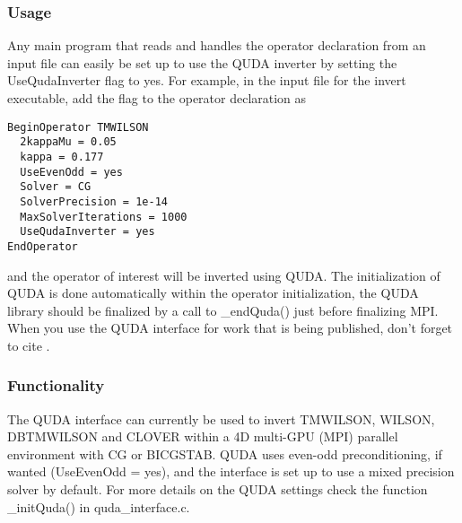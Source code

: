 \subsubsection{Usage}
Any main program that reads and handles the operator declaration from an input file can easily be set up to use the QUDA inverter by setting the {\ttfamily UseQudaInverter} flag to {\ttfamily yes}. For example, in the input file for the {\ttfamily invert} executable, add the flag to the operator declaration as
\begin{verbatim}
BeginOperator TMWILSON
  2kappaMu = 0.05
  kappa = 0.177
  UseEvenOdd = yes
  Solver = CG
  SolverPrecision = 1e-14
  MaxSolverIterations = 1000
  UseQudaInverter = yes
EndOperator
\end{verbatim}
and the operator of interest will be inverted using QUDA. The initialization of QUDA is done automatically within the operator initialization,  the QUDA library should be finalized by a call to {\ttfamily \_endQuda()} just before finalizing MPI. When you use the QUDA interface for work that is being published, don't forget to cite \cite{Clark:2009wm, Babich:2011np, Strelchenko:2013vaa}.


\subsubsection{Functionality}
The QUDA interface can currently be used to invert {\ttfamily TMWILSON, WILSON, DBTMWILSON} and {\ttfamily CLOVER} within a 4D multi-GPU (MPI) parallel environment with CG or BICGSTAB. QUDA uses even-odd preconditioning, if wanted ({\ttfamily UseEvenOdd = yes}), and the interface is set up to use a mixed precision solver by default. For more details on the QUDA settings check the function {\ttfamily \_initQuda()} in {\ttfamily quda\_interface.c}.







